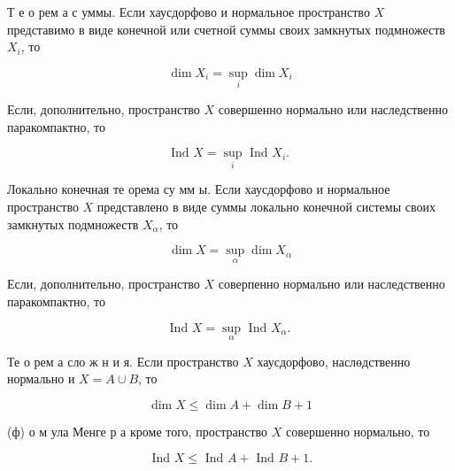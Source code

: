 \documentclass[10pt]{article}
\begin{document}
Т е о рем а с уммы. Если хаусдорфово и нормальное пространство $X$ представимо в виде конечной или счетной суммы своих замкнутых подмножеств $X_{i}$, то



\[

\operatorname{dim} X_{i}=\sup _{i} \operatorname{dim} X_{i}

\]



Если, дополнительно, пространство $X$ совершенно нормально или наследственно паракомпактно, то



\[

\text { Ind } X=\sup _{i} \text { Ind } X_{i} \text {. }

\]



Локально конечная те орема су мм ы. Если хаусдорфово и нормальное пространство $X$ представлено в виде суммы локально конечной системы своих замкнутых подмножеств $X_{\alpha}$, то



\[

\operatorname{dim} X=\sup _{\alpha} \operatorname{dim} X_{\alpha}

\]



Если, дополнительно, пространство $X$ соверпенно нормально или наследственно паракомпактно, то



\[

\text { Ind } X=\sup _{\alpha} \text { Ind } X_{\alpha} \text {. }

\]



Те о рем а сло ж н и я. Если пространство $X$ хаусдорфово, наслөдственно нормально и $X=A \cup B$, то



\[

\operatorname{dim} X \leqslant \operatorname{dim} A+\operatorname{dim} B+1

\]



(ф) о м ула Менге р а кроме того, пространство $X$ совершенно нормально, то



\[

\text { Ind } X \leqslant \text { Ind } A+\text { Ind } B+1 .

\]
\end{document}
